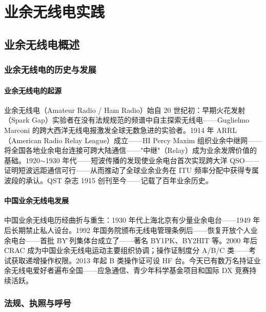 \documentclass[12pt,UTF8]{ctexbook}
\begin{document}
\part{业余无线电实践}

\chapter{业余无线电概述}
\label{chap:ham_overview}

\section{业余无线电的历史与发展}
\label{sec:ham_history}

\subsection{业余无线电的起源}

业余无线电（Amateur Radio / Ham Radio）始自 20 世纪初：早期火花发射（Spark Gap）实验者在没有法规规范的频谱中自主探索无线电——Guglielmo Marconi 的跨大西洋无线电报激发全球无数急进的实验者。1914 年 ARRL（American Radio Relay League）成立——HI Percy Maxim 组织业余中继网——将全国各地业余电台连接可跨大陆通信——"中继"（Relay）成为业余发牌价值的基础。1920$\sim$1930 年代——短波传播的发现使业余电台首次实现跨大洋 QSO——证明短波远距通信可行——从而推动了全球业余业务在 ITU 频率分配中获得专属波段的承认。QST 杂志 1915 创刊至今——记载了百年业余历史。

\subsection{中国业余无线电发展}

中国业余无线电历经曲折与重生：1930 年代上海北京有少量业余电台——1949 年后长期禁止私人设台。1992 年国务院颁布无线电管理条例后——恢复开放个人业余电台——首批 \"BY\" 系列集体台成立了——著名 BY1PK、BY2HIT 等。2000 年后 CRAC 成为中国业余无线电运动主要组织协调；操作证制度分 A/B/C 类——考试获取递增操作权限。2013 年起 B 类操作证可设 HF 台。今天已有数万名持证业余无线电爱好者遍布全国——应急通信、青少年科学基金项目和国际 DX 竞赛持续活跃。

\section{法规、执照与呼号}
\label{sec:ham_license}
\end{document}
